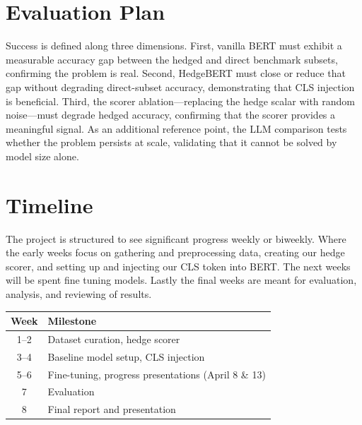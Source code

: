 \documentclass[11pt]{article}
\begin{document}
\section{Evaluation Plan}

Success is defined along three dimensions. First, vanilla BERT must exhibit a
measurable accuracy gap between the hedged and direct benchmark subsets, confirming
the problem is real. Second, HedgeBERT must close or reduce that gap without
degrading direct-subset accuracy, demonstrating that CLS injection is beneficial.
Third, the scorer ablation---replacing the hedge scalar with random noise---must
degrade hedged accuracy, confirming that the scorer provides a meaningful signal. As
an additional reference point, the LLM comparison tests whether the problem persists
at scale, validating that it cannot be solved by model size alone.



\section{Timeline}

The project is structured to see significant progress weekly or biweekly. 
Where the early weeks focus on gathering and preprocessing data, creating 
our hedge scorer, and setting up and injecting our CLS token into BERT. The 
next weeks will be spent fine tuning models. Lastly the final weeks are meant
for evaluation, analysis, and reviewing of results.  

\begin{table}[h]
\centering
\small
\begin{tabular}{cl}
\toprule
\textbf{Week} & \textbf{Milestone} \\
\midrule
1--2 & Dataset curation, hedge scorer \\
3--4 & Baseline model setup, CLS injection \\
5--6 & Fine-tuning, progress presentations (April 8 \& 13) \\
7    & Evaluation \\
8    & Final report and presentation \\
\bottomrule
\end{tabular}
\end{table}


\end{document}
